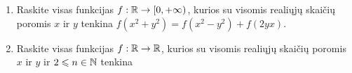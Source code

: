 \begin{enumerate}
  \item Raskite visas funkcijas $f:\mathbb R\to[0,+\infty)$, kurios su visomis
    realiųjų skaičių poromis $x$ ir $y$ tenkina
    $f(x^{2}+y^{2})=f(x^{2}-y^{2})+f(2yx)$.
  \item Raskite visas funkcijas $f:\mathbb R\to\mathbb R$, kurios su visomis realiųjų
    skaičių poromis $x$ ir $y$ ir $2\leqslant n\in\mathbb N$ tenkina

\end{enumerate}
